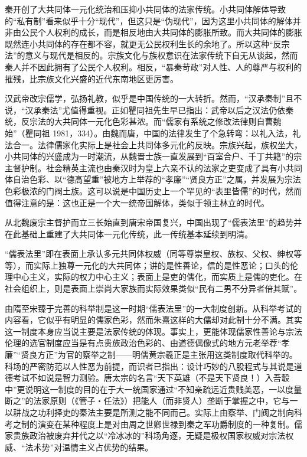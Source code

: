 \documentclass[a4paper,12pt,punct=kaiming,fontset=none]{ctexart}
\begin{document}
秦开创了大共同体一元化统治和压抑小共同体的法家传统。小共同体解体导致的“私有制”看来似乎十分“现代”，但这只是“伪现代”，因为这里小共同体的解体并非由公民个人权利的成长，而是相反地由大共同体的膨胀所致。而大共同体的膨胀既然连小共同体的存在都不容，就更无公民权利生长的余地了。所以这种“反宗法”的意义与现代是相反的。宗族文化与族权意识在法家传统下自无从谈起，然而秦人并不因此拥有了公民个人权利。相反，“暴秦苛政”对人性、人的尊严与权利的摧残，比宗族文化兴盛的近代东南地区更厉害。

汉武帝改宗儒学，弘扬礼教，似乎是中国传统的一大转折。然而，“汉承秦制”且不说，“汉承秦法”尤值得重视。正如瞿同祖先生早已指出：武帝以后之汉法仍依秦统，反宗法的大共同体一元化色彩甚浓。而“儒家有系统之修改法律则自曹魏始”（瞿同祖 1981，334）。由魏而唐，中国的法律发生了个急转弯：以礼入法，礼法合一。法律儒家化实际上是社会上共同体多元化的反映。宗族兴起，族权坐大，小共同体的兴盛成为一时潮流，从魏晋士族一直发展到“百室合户、千丁共籍”的宗主督护制。社会精英主流也由秦汉时为皇上六亲不认的法家之吏变成了具有小共同体自治色彩、以“德高望重”被地方上举荐的“孝廉”“贤良方正”之属，并发展为宗法色彩极浓的门阀土族。这可以说是中国历史上一个罕见的“表里皆儒”的时代，然而值得注意的是：这也正是一个大一统帝国解体，类似于领主林立的时代。

从北魏废宗主督护而立三长始直到唐宋帝国复兴，中国出现了“儒表法里”的趋势并在此基础上重建了大共同体一元化传统，此一传统基本延续到明清。

“儒表法里”即在表面上承认多元共同体权威（同等尊崇皇权、族权、父权、绅权等等），而实际上独尊一元化的大共同体；讲的是性善论，信的是性恶论；口头的伦理中心主义，实际的权力中心主义；表面上是吏的儒化，而实质上是儒的吏化。在社会组织上，则是表面上崇尚大家族而实际效果类似“民有二男不分异者倍其赋”。

由隋至宋臻于完善的科举制是这一时期“儒表法里”的一大制度创新。从科举考试的内容看，它似乎有明显的儒家色彩，然而朱熹这样的大儒却对此制十分不满。其实这一制度本身应当说主要是法家传统的体现。事实上，更能体现儒家性善论与宗法伦理的选官制度应当是有点贵族政治色彩的、由道德偶像式的地方元老举荐“孝廉”“贤良方正”为官的察举之制——明儒黄宗羲正是主张用这类制度取代科举的。科场的严密防范以人性恶为前提，而识者已指出：设计巧妙的八股程式与其说是道德考试不如说是智力测验。唐太宗的名言“天下英雄（不是天下贤良！）入吾彀中”更说明这一制度的目的在于大一统国家通过“不知亲疏远近贵贱美恶，一以度量断之”的法家原则（《管子・任法》）把能人（而非贤人）垄断于掌握之中，它与一以耕战之功利择吏的秦法主要是所测之能不同而己。实际上由察举、门阀之制向科考之制的演变在某种程度上是对由周之世卿世禄到秦之军功爵制度的一种复制。儒家贵族政治被废弃并代之以“冷冰冰的”科场角逐，无疑是极权国家权威对宗法权威、“法术势”对温情主义占优势的结果。
\end{document}
